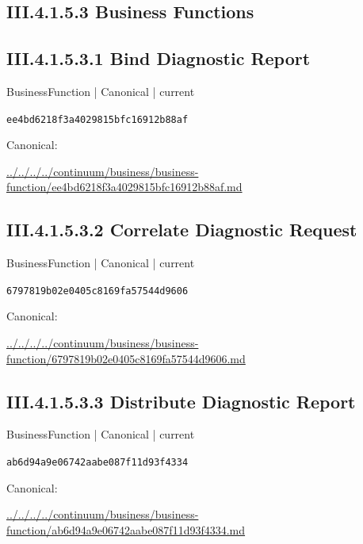 \documentclass[10pt,a4paper]{article}
\begin{document}
\subsection*{III.4.1.5.3 Business Functions}
\subsection*{III.4.1.5.3.1 Bind Diagnostic Report}
\label{element-ee4bd6218f3a4029815bfc16912b88af}
{\small BusinessFunction | Canonical | current}\par
\texttt{ee4bd6218f3a4029815bfc16912b88af}\par
Canonical: \par
{\footnotesize\url{../../../../continuum/business/business-function/ee4bd6218f3a4029815bfc16912b88af.md}}\par
\subsection*{III.4.1.5.3.2 Correlate Diagnostic Request}
\label{element-6797819b02e0405c8169fa57544d9606}
{\small BusinessFunction | Canonical | current}\par
\texttt{6797819b02e0405c8169fa57544d9606}\par
Canonical: \par
{\footnotesize\url{../../../../continuum/business/business-function/6797819b02e0405c8169fa57544d9606.md}}\par
\subsection*{III.4.1.5.3.3 Distribute Diagnostic Report}
\label{element-ab6d94a9e06742aabe087f11d93f4334}
{\small BusinessFunction | Canonical | current}\par
\texttt{ab6d94a9e06742aabe087f11d93f4334}\par
Canonical: \par
{\footnotesize\url{../../../../continuum/business/business-function/ab6d94a9e06742aabe087f11d93f4334.md}}\par
\end{document}
